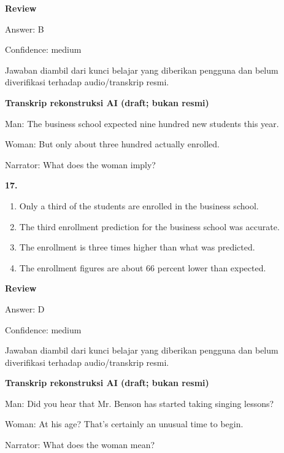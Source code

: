 \documentclass[12pt]{article}
\begin{document}
\par
\begingroup
\setlength{\parskip}{0pt}
\setlength{\parindent}{0pt}
\textbf{Review}\par
Answer: B\par
Confidence: medium\par
Jawaban diambil dari kunci belajar yang diberikan pengguna dan belum diverifikasi terhadap audio/transkrip resmi.\par
\endgroup
\par
\vspace{0.25\baselineskip}
\begin{exampleblock}
\textbf{Transkrip rekonstruksi AI (draft; bukan resmi)}\par
Man: The business school expected nine hundred new students this year.\par
Woman: But only about three hundred actually enrolled.\par
Narrator: What does the woman imply?\par
\end{exampleblock}
\noindent\textbf{17.}
\begin{enumerate}[label=(\Alph*),leftmargin=*,itemsep=0.2em]
\item Only a third of the students are enrolled in the business school.
\item The third enrollment prediction for the business school was accurate.
\item The enrollment is three times higher than what was predicted.
\item The enrollment figures are about 66 percent lower than expected.
\end{enumerate}
\par
\begingroup
\setlength{\parskip}{0pt}
\setlength{\parindent}{0pt}
\textbf{Review}\par
Answer: D\par
Confidence: medium\par
Jawaban diambil dari kunci belajar yang diberikan pengguna dan belum diverifikasi terhadap audio/transkrip resmi.\par
\endgroup
\par
\vspace{0.25\baselineskip}
\begin{exampleblock}
\textbf{Transkrip rekonstruksi AI (draft; bukan resmi)}\par
Man: Did you hear that Mr. Benson has started taking singing lessons?\par
Woman: At his age? That's certainly an unusual time to begin.\par
Narrator: What does the woman mean?\par
\end{exampleblock}
\end{document}
